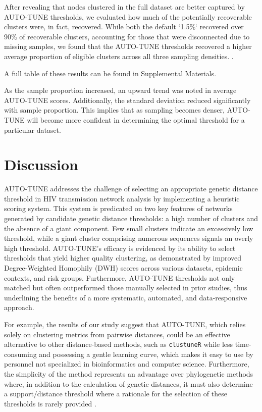 \documentclass[utf8]{FrontiersinHarvard} %
\newcommand{\TODO}[1]{{\color{red}{#1}}}
\begin{document}
After revealing that nodes clustered in the full dataset are better captured by
AUTO-TUNE thresholds, we evaluated how much of the potentially recoverable
clusters were, in fact, recovered. While both the default `1.5\%` recovered
over 90\% of recoverable clusters, accounting for those that were disconnected
due to missing samples, we found that the AUTO-TUNE thresholds recovered a
higher average proportion of eligible clusters across all three sampling
densities. \TODO{Create another visualization}.


A full table of these results can be found in Supplemental Materials.

As the sample proportion increased, an upward trend was noted in average
AUTO-TUNE scores. Additionally, the standard deviation reduced significantly
with sample proportion. This implies that as sampling becomes denser, AUTO-TUNE
will become more confident in determining the optimal threshold for a
particular dataset.

\section{Discussion}

AUTO-TUNE addresses the challenge of selecting an appropriate genetic distance
threshold in HIV transmission network analysis by implementing a heuristic
scoring system. This system is predicated on two key features of networks
generated by candidate genetic distance thresholds: a high number of clusters
and the absence of a giant component. Few small clusters indicate an
excessively low threshold, while a giant cluster comprising numerous sequences
signals an overly high threshold. AUTO-TUNE's efficacy is evidenced by its
ability to select thresholds that yield higher quality clustering, as
demonstrated by improved Degree-Weighted Homophily (DWH) scores across various
datasets, epidemic contexts, and risk groups. Furthermore, AUTO-TUNE thresholds
not only matched but often outperformed those manually selected in prior
studies, thus underlining the benefits of a more systematic, automated, and
data-responsive approach.

For example, the results of our study suggest that AUTO-TUNE, which relies
solely on clustering metrics from pairwise distances, could be an effective
alternative to other distance-based methods, such as {\tt clustuneR} while less
time-consuming and possessing a gentle learning curve, which makes it easy to
use by personnel not specialized in bioinformatics and computer science.
Furthermore, the simplicity of the method represents an advantage over
phylogenetic methods where, in addition to the calculation of genetic
distances, it must also determine a support/distance threshold where a
rationale for the selection of these thresholds is rarely provided
\citep{junqueira_factors_2019}.
\end{document}
